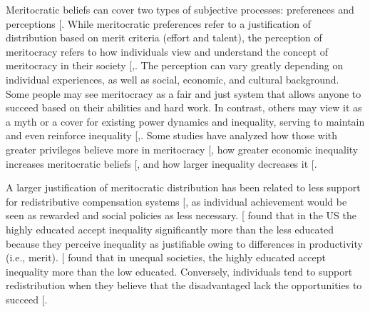 \documentclass[
  12pt,
  letterpaper,
]{article}
\begin{document}
Meritocratic beliefs can cover two types of subjective processes:
preferences and perceptions
{[}\citeproc{ref-castillo_multidimensional_2023}{47}{]}. While
meritocratic preferences refer to a justification of distribution based
on merit criteria (effort and talent), the perception of meritocracy
refers to how individuals view and understand the concept of meritocracy
in their society
{[},\citeproc{ref-castillo_meritocracia_2019}{51}{]}.
The perception can vary greatly depending on individual experiences, as
well as social, economic, and cultural background. Some people may see
meritocracy as a fair and just system that allows anyone to succeed
based on their abilities and hard work. In contrast, others may view it
as a myth or a cover for existing power dynamics and inequality, serving
to maintain and even reinforce inequality
{[},\citeproc{ref-lampert_meritocratic_2013}{52}{]}.
Some studies have analyzed how those with greater privileges believe
more in meritocracy {[}\citeproc{ref-reynolds_perceptions_2014}{53}{]},
how greater economic inequality increases meritocratic beliefs
{[}\citeproc{ref-mijs_paradox_2019}{49}{]}, and how larger inequality
decreases it {[}\citeproc{ref-morris_representing_2022}{54}{]}.

A larger justification of meritocratic distribution has been related to
less support for redistributive compensation systems
{[}\citeproc{ref-frank_performance_2015}{55}{]}, as individual
achievement would be seen as rewarded and social policies as less
necessary. {[}\citeproc{ref-almas_cutthroat_2020}{56}{]} found that in
the US the highly educated accept inequality significantly more than the
less educated because they perceive inequality as justifiable owing to
differences in productivity (i.e., merit).
{[}\citeproc{ref-barr_effect_2020}{57}{]} found that in unequal
societies, the highly educated accept inequality more than the low
educated. Conversely, individuals tend to support redistribution when
they believe that the disadvantaged lack the opportunities to succeed
{[}\citeproc{ref-evans_strong_2018}{58}{]}.
\end{document}
